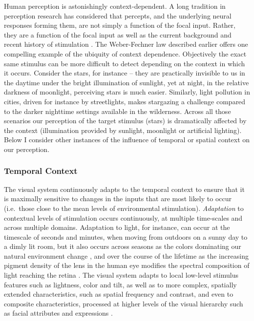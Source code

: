 \documentclass[a4paper, nobind]{templates/ociamthesis}
\begin{document}
Human perception is astonishingly context-dependent. A long tradition in perception research has considered that percepts, and the underlying neural responses forming them, are not simply a function of the focal input. Rather, they are a function of the focal input as well as the current background and recent history of stimulation \autocite{webster2015}. The Weber-Fechner law described earlier offers one compelling example of the ubiquity of context dependence. Objectively the exact same stimulus can be more difficult to detect depending on the context in which it occurs. Consider the stars, for instance -- they are practically invisible to us in the daytime under the bright illumination of sunlight, yet at night, in the relative darkness of moonlight, perceiving stars is much easier. Similarly, light pollution in cities, driven for instance by streetlights, makes stargazing a challenge compared to the darker nighttime settings available in the wilderness. Across all those scenarios our perception of the target stimulus (stars) is dramatically affected by the context (illumination provided by sunlight, moonlight or artificial lighting). Below I consider other instances of the influence of temporal or spatial context on our perception.

\hypertarget{temporal-context}{%
\subsubsection{Temporal Context}\label{temporal-context}}

The visual system continuously adapts to the temporal context to ensure that it is maximally sensitive to changes in the inputs that are most likely to occur (i.e.~those close to the mean levels of environmental stimulation). \emph{Adaptation} to contextual levels of stimulation occurs continuously, at multiple time-scales and across multiple domains. Adaptation to light, for instance, can occur at the timescale of seconds and minutes, when moving from outdoors on a sunny day to a dimly lit room, but it also occurs across seasons as the colors dominating our natural environment change \autocite{welbourne2015}, and over the course of the lifetime as the increasing pigment density of the lens in the human eye modifies the spectral composition of light reaching the retina \autocite{webster2015}. The visual system adapts to local low-level stimulus features such as lightness, color and tilt, as well as to more complex, spatially extended characteristics, such as spatial frequency and contrast, and even to composite characteristics, processed at higher levels of the visual hierarchy such as facial attributes and expressions \autocite{webster2011}.
\end{document}
